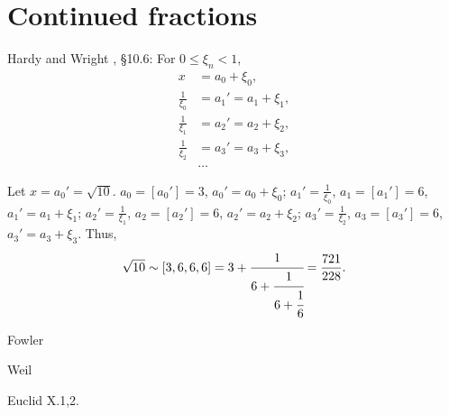 \documentclass{article}
\theoremstyle{definition}
\begin{document}
\section{Continued fractions}
Hardy and Wright \cite{hardy}, \S 10.6: 
For $0 \leq \xi_n < 1$,
\begin{align*}
x&=a_0+\xi_0,\\
\frac{1}{\xi_0}&=a_1'=a_1+\xi_1,\\
\frac{1}{\xi_1}&=a_2'=a_2+\xi_2,\\
\frac{1}{\xi_2}&=a_3'=a_3+\xi_3,\\
&\ldots
\end{align*}

Let $x=a_0'=\sqrt{10}$. 
$a_0=[a_0']=3$, $a_0'=a_0+\xi_0$;
$a_1'=\frac{1}{\xi_0}$, $a_1=[a_1']=6$, $a_1'=a_1+\xi_1$;
$a_2'=\frac{1}{\xi_1}$, $a_2=[a_2']=6$, $a_2'=a_2+\xi_2$;
$a_3'=\frac{1}{\xi_2}$, $a_3=[a_3']=6$, $a_3'=a_3+\xi_3$.
Thus,
\[
\sqrt{10} \sim [3,6,6,6] = 3+\cfrac{1}{6+\cfrac{1}{6+\cfrac{1}{6}}}
=\frac{721}{228}.
\]

Fowler \cite{fowler}

Weil \cite{weil}


Euclid X.1,2.








\end{document}

